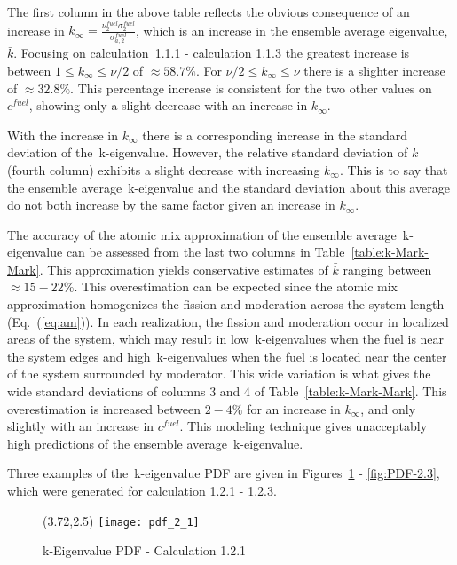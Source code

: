 \noindent
	\indent The first column in the above table reflects the obvious consequence of an
	increase in
	${k_{\infty}=\frac{\nu_2^{fuel}\sigma_2^{fuel}}{\sigma_{a,2}^{fuel}}}$, which is an
	increase in the ensemble average eigenvalue, ${\bar{k}}$.  Focusing on
	calculation~1.1.1 - calculation 1.1.3 the greatest increase is between
	$1 \le {k_{\infty}} \le \nu/2$ of ${\approx58.7\%}$.  For $\nu/2 \le {k_{\infty}} \le \nu$ there is a 
	slighter increase of ${\approx32.8\%}$.  This percentage increase is consistent for the two other 
	values on ${c^{fuel}}$, showing only a slight decrease with an increase in ${k_{\infty}}$.
	
\noindent
	\indent With the increase in ${k_{\infty}}$ there is a corresponding increase in the 
	standard deviation of the~k-eigenvalue.  However, the relative standard deviation
	of ${\bar{k}}$ (fourth column) exhibits a slight decrease with increasing ${k_{\infty}}$.  This
	is to say that the ensemble average~k-eigenvalue and the standard deviation about this
	average do not both increase by the same factor given an increase in ${k_{\infty}}$.
	
\noindent
	\indent The accuracy of the atomic mix approximation of the ensemble average~k-eigenvalue
	can be assessed from the last two columns in Table~\ref{table:k-Mark-Mark}.  This
	approximation yields conservative estimates of ${\bar{k}}$ ranging between
	${\approx 15 - 22\%}$.  This overestimation can be expected since the atomic mix
	approximation homogenizes the fission and moderation across the system length
	(Eq.~(\ref{eq:am})).  In each
	realization, the fission and moderation occur in localized areas of the system, which may
	result in low~k-eigenvalues when the fuel is near the system edges and high~k-eigenvalues
	when the fuel is located near the center of the system surrounded by moderator.  This wide
	variation is what gives the wide standard deviations of columns 3 and 4 of
	Table~\ref{table:k-Mark-Mark}.  This overestimation is increased between ${2 - 4\%}$ for 
	an increase in ${k_{\infty}}$, and only slightly with an increase in ${c^{fuel}}$.  This modeling
	technique gives unacceptably high predictions of the ensemble average~k-eigenvalue.
	
\noindent
	\indent Three examples of the~k-eigenvalue PDF are given in Figures~\ref{fig:PDF-2.1} - 
	\ref{fig:PDF-2.3}, which were generated for calculation 1.2.1 - 1.2.3.
	\vspace{0.2in}
	\begin{figure}[htbp]
		\begin{center}
			\begin{minipage}[t]{3.72in}
			\begin{picture}(3.72,2.5)
	            	{\texttt{[image: pdf\_2\_1]}}
			\end{picture}
			\caption{\label{fig:PDF-2.1} k-Eigenvalue PDF - Calculation 1.2.1}
			\end{minipage} %
		\end{center}
	\end{figure}	
	\vspace{-0.25in}
	
